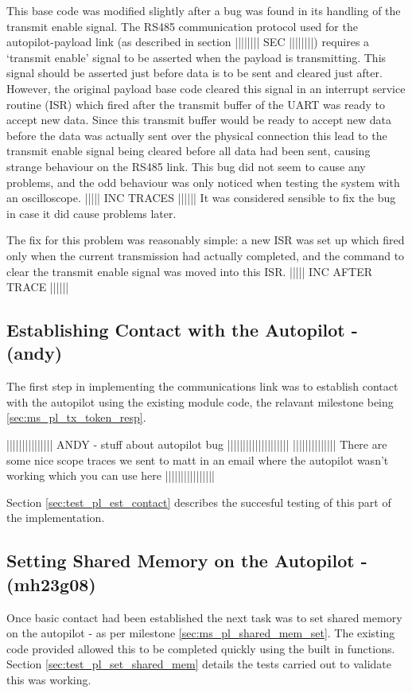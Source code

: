 This base code was modified slightly after a bug was found in its handling of 
the transmit enable signal. The RS485 communication protocol used for the 
autopilot-payload link (as described in section |||||||| SEC ||||||||) 
requires a `transmit enable' signal to be asserted when the payload is 
transmitting. This signal should be asserted just before data is to be sent 
and cleared just after. However, the original payload base code cleared this 
signal in an interrupt service routine (ISR) which fired after the transmit 
buffer of the UART was ready to accept new data. Since this transmit buffer 
would be ready to accept new data before the data was actually sent over the
physical connection this lead to the transmit enable signal being cleared
before all data had been sent, causing strange behaviour on the RS485 link.
This bug did not seem to cause any problems, and the odd behaviour was only
noticed when testing the system with an oscilloscope. ||||| INC TRACES ||||||
It was considered sensible to fix the bug in case it did cause problems later.

The fix for this problem was reasonably simple: a new ISR was set up which 
fired only when the current transmission had actually completed, and the 
command to clear the transmit enable signal was moved into this ISR.
||||| INC AFTER TRACE ||||||

\subsection{Establishing Contact with the Autopilot - (andy)}

The first step in implementing the communications link was to establish contact with
the autopilot using the existing module code, the relavant milestone being
\ref{sec:ms_pl_tx_token_resp}.

||||||||||||||| ANDY - stuff about autopilot bug ||||||||||||||||||||
|||||||||||||| There are some nice scope traces we sent to matt in an email where the autopilot wasn't working which you can use here ||||||||||||||||

Section \ref{sec:test_pl_est_contact} describes the succesful testing of this part of
the implementation.

\subsection{Setting Shared Memory on the Autopilot - (mh23g08)}
Once basic contact had been established the next task was to set shared memory on
the autopilot - as per milestone \ref{sec:ms_pl_shared_mem_set}. The existing code
provided allowed this to be completed quickly using the built in functions. Section 
\ref{sec:test_pl_set_shared_mem} details the tests carried out to validate this
was working.

